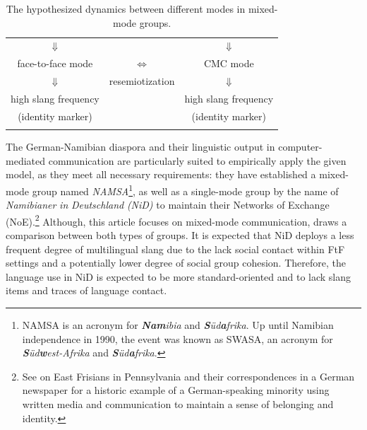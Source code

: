 \documentclass[output=paper]{langsci/langscibook}
\begin{document}
\begin{table}
\begin{tabularx}{0.87\textwidth}{ccc}
\lsptoprule
\multicolumn{3}{c}{mixed-mode groups (in language-contact settings)}\\
\hline
${\Downarrow}$ & & ${\Downarrow}$ \\
face-to-face mode & ${\Leftrightarrow}$ & {CMC mode}\\
${\Downarrow}$ & resemiotization & ${\Downarrow}$ \\
 high slang frequency & & high slang frequency\\
(identity marker) & & (identity marker) \\
\lspbottomrule
\end{tabularx}
\caption{The hypothesized dynamics between different modes in mixed-mode groups.}
\label{tab:radke:1}
\end{table}  



The German-Namibian diaspora and their linguistic output in computer-mediated communication are particularly suited to empirically apply the given model, as they meet all necessary requirements: they have established a mixed-mode group named \textit{NAMSA}\footnote{NAMSA is an acronym for \textbf{\textit{Nam}}\textit{ibia} and \textbf{\textit{S}}\textit{üd}\textbf{\textit{a}}\textit{frika}. Up until Namibian independence in 1990, the event was known as SWASA, an acronym for \textbf{\textit{S}}\textit{üd}\textbf{\textit{w}}\textit{est-Afrika} and \textbf{\textit{S}}\textit{üd}\textbf{\textit{a}}\textit{frika}.}, as well as a single-mode group by the name of \textit{Namibianer} \textit{in} \textit{Deutschland} \textit{(NiD)} to maintain their Networks of Exchange (NoE).\footnote{See  on East Frisians in Pennsylvania and their correspondences in a German newspaper for a historic example of a German-speaking minority using written media and communication to maintain a sense of belonging and identity.} Although, this article focuses on mixed-mode communication,  draws a comparison between both types of groups. It is expected that NiD deploys a less frequent degree of multilingual slang due to the lack social contact within FtF settings and a potentially lower degree of social group cohesion. Therefore, the language use in NiD is expected to be more standard-oriented and to lack slang items and traces of language contact.%
\end{document}
